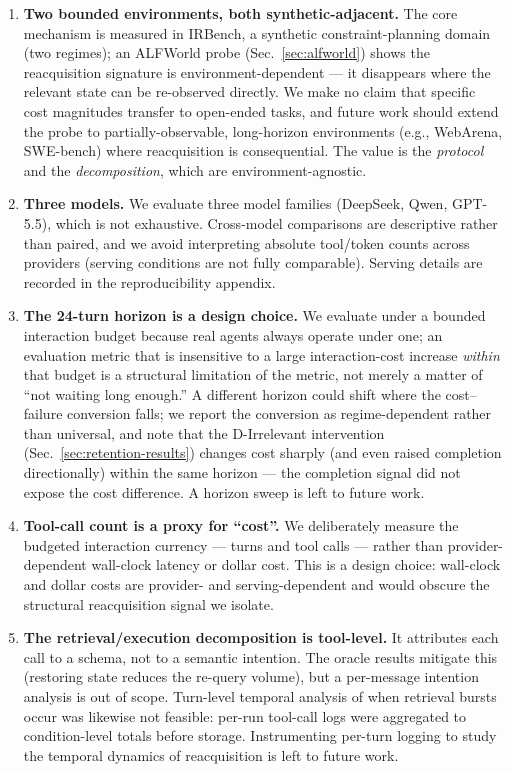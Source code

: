 \documentclass[11pt]{article}
\begin{document}
\begin{enumerate}
\item \textbf{Two bounded environments, both synthetic-adjacent.} The core mechanism is measured
  in IRBench, a synthetic constraint-planning domain (two regimes); an ALFWorld probe
  (Sec.~\ref{sec:alfworld}) shows the reacquisition signature is environment-dependent --- it disappears where the
  relevant state can be re-observed directly. We make no claim that specific cost
  magnitudes transfer to open-ended tasks, and future work should extend the probe to
  partially-observable, long-horizon environments (e.g., WebArena, SWE-bench) where
  reacquisition is consequential. The value is the \emph{protocol} and the \emph{decomposition},
  which are environment-agnostic.

\item \textbf{Three models.} We evaluate three model families (DeepSeek, Qwen, GPT-5.5), which is
  not exhaustive. Cross-model comparisons are descriptive rather than paired, and we
  avoid interpreting absolute tool/token counts across providers (serving conditions are
  not fully comparable). Serving details are recorded in the reproducibility appendix.

\item \textbf{The 24-turn horizon is a design choice.} We evaluate under a bounded interaction
  budget because real agents always operate under one; an evaluation metric that is
  insensitive to a large interaction-cost increase \emph{within} that budget is a structural
  limitation of the metric, not merely a matter of ``not waiting long enough.'' A different
  horizon could shift where the cost--failure conversion falls; we report the conversion
  as regime-dependent rather than universal, and note that the D-Irrelevant intervention
  (Sec.~\ref{sec:retention-results}) changes cost sharply (and even raised completion directionally) within the same
  horizon --- the completion signal did not expose the cost difference. A horizon sweep is
  left to future work.

\item \textbf{Tool-call count is a proxy for ``cost''.} We deliberately measure the budgeted
  interaction currency --- turns and tool calls --- rather than provider-dependent wall-clock
  latency or dollar cost. This is a design choice: wall-clock and dollar costs are
  provider- and serving-dependent and would obscure the structural reacquisition signal
  we isolate.

\item \textbf{The retrieval/execution decomposition is tool-level.} It attributes each call to a
  schema, not to a semantic intention. The oracle results mitigate this (restoring state
  reduces the re-query volume), but a per-message intention analysis is out of scope.
  Turn-level temporal analysis of when retrieval bursts occur was likewise not feasible:
  per-run tool-call logs were aggregated to condition-level totals before storage.
  Instrumenting per-turn logging to study the temporal dynamics of reacquisition is left
  to future work.


\end{enumerate}
\end{document}
